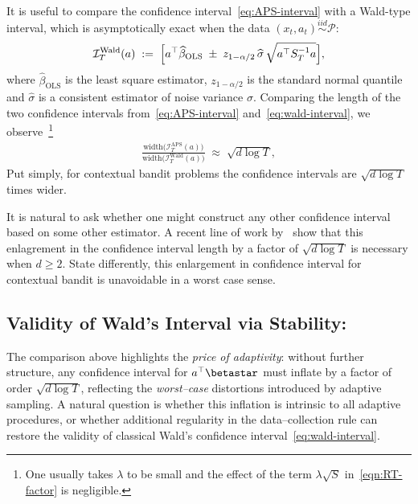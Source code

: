 \documentclass[11pt,letterpaper]{article}
\newcommand{\betaols}{\widehat{\beta}_{\mathrm{OLS}}}
\theoremstyle{plain}
\theoremstyle{definition}  %
\begin{document}
\newcommand{\iid}{\stackrel{iid}{\sim}}

It is useful to compare the confidence interval~\eqref{eq:APS-interval} with a Wald-type interval, which is asymptotically exact when the data $(x_t, a_t) \iid \mathcal{P}$: 
%
\begin{align} \label{eq:wald-interval}
    \mathcal{I}^{\mathrm{Wald}}_T(a)
    \;:=\;
    \Bigl[
        a^\top \betaols
        \;\pm\;
        z_{1-\alpha/2}\,
        \widehat\sigma\, \sqrt{a^\top S_T^{-1} a}
    \Bigr],
\end{align}
where $\betaols$ is the least square estimator,  \(z_{1-\alpha/2}\) is the standard normal quantile and \(\hat\sigma\) is a consistent estimator of noise variance \(\sigma\). Comparing the length of the two confidence intervals from~\eqref{eq:APS-interval} and~\eqref{eq:wald-interval}, we observe~\footnote{One usually takes $\lambda$ to be small and the effect of the term $\lambda\sqrt{S}$ in~\eqref{eqn:RT-factor} is negligible.}  
%
\begin{align}
    \frac{\mathrm{width}\bigl(\mathcal{I}^{\mathrm{APS}}_T(a)\bigr)}
         {\mathrm{width}\bigl(\mathcal{I}^{\mathrm{Wald}}_T(a)\bigr)}
    \;\approx\;
    \sqrt{d \log T},
    \label{eqn:CI_length-compare}
\end{align}
Put simply, for contextual bandit problems the confidence intervals are $\sqrt{d\log T}$ times wider.

It is natural to ask whether one might construct any other confidence interval based on some other estimator. A recent line of work by~\cite{lattimore2023lower,khamaru2021near,vakili2021open} show that this enlagrement in the confidence interval length by a factor of $\sqrt{d\log T}$ is necessary when $d \geq 2$. State differently, this enlargement in confidence interval for contextual bandit is unavoidable in a worst case sense.


\subsection{Validity of Wald's Interval via Stability:}
%
The comparison above highlights the \emph{price of adaptivity}: without further structure, any
confidence interval for $a^\top\betastar$ must inflate by a factor of order $\sqrt{d\log T}$, reflecting
the \emph{worst–case} distortions introduced by adaptive sampling. A natural question is whether this
inflation is intrinsic to all adaptive procedures, or whether additional regularity in the data--collection
rule can restore the validity of classical Wald's confidence interval~\eqref{eq:wald-interval}.
\end{document}

